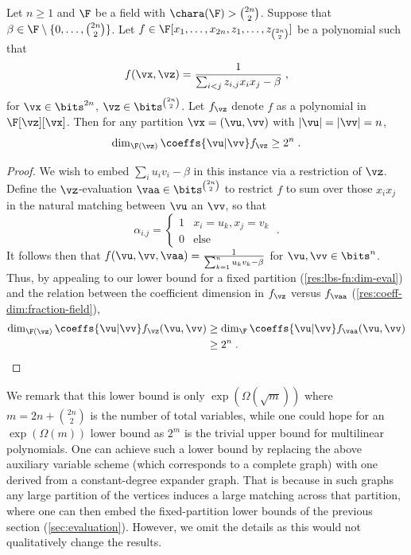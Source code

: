 \documentclass{toc}
\begin{document}
\begin{proposition}\label{res:lbs-fn:any-order:coeff-dim}
        Let $n\ge 1$ and $\F$ be a field with $\chara(\F)>\binom{2n}{2}$.  Suppose that $\beta\in\F\setminus\{0,\ldots,\binom{2n}{2}\}$.  Let $f\in\F[x_1,\ldots,x_{2n},z_1,\ldots,z_{\binom{2n}{2}}]$ be a polynomial such that
        \[
                f(\vx,\vz)=\frac{1}{\sum_{i<j} z_{i,j}x_ix_j-\beta}
                \;,
        \]
        for $\vx\in\bits^{2n}$, $\vz\in\bits^{\binom{2n}{2}}$. Let $f_\vz$ denote $f$ as a polynomial in $\F[\vz][\vx]$.  Then for any partition $\vx=(\vu,\vv)$ with $|\vu|=|\vv|=n$,
        \[
                \dim_{\F(\vz)}\coeffs{\vu|\vv} f_\vz \ge 2^n
                \;.
        \]
\end{proposition}
\begin{proof}
        We wish to embed $\sum_i u_iv_i-\beta$ in this instance via a restriction of $\vz$. Define the $\vz$-evaluation $\vaa\in\bits^{\binom{2n}{2}}$ to restrict $f$ to sum over those $x_ix_j$ in the natural matching between $\vu$ an $\vv$, so that
        \[
                \alpha_{i.j}
                =\begin{cases}
                        1       &       x_i=u_k, x_j=v_k\\
                        0       &       \text{else}
                \end{cases}
                \;.
        \]
        It follows then that $f(\vu,\vv,\vaa)=\frac{1}{\sum_{k=1}^n u_kv_k-\beta}$ for $\vu,\vv\in\bits^{n}$. Thus, by appealing to our lower bound for a fixed partition (\autoref{res:lbs-fn:dim-eval}) and the relation between the coefficient dimension in $f_\vz$ versus $f_\vaa$ (\autoref{res:coeff-dim:fraction-field}),
        \begin{align*}
                \dim_{\F(\vz)}\coeffs{\vu|\vv} f_\vz(\vu,\vv)
                &\ge \dim_\F \coeffs{\vu|\vv}f_\vaa(\vu,\vv)\\
                &\ge 2^n
                \;.
                \qedhere
        \end{align*}
\end{proof}

We remark that this lower bound is only $\exp(\Omega(\sqrt{m}))$ where $m=2n+\binom{2n}{2}$ is the number of total variables, while one could hope for an $\exp(\Omega(m))$ lower bound as $2^m$ is the trivial upper bound for multilinear polynomials.  One can achieve such a lower bound by replacing the above auxiliary variable scheme (which corresponds to a complete graph) with one derived from a constant-degree expander graph. That is because in such graphs any large partition of the vertices induces a large matching across that partition, where one can then embed the fixed-partition lower bounds of the previous section (\autoref{sec:evaluation}).  However, we omit the details as this would not qualitatively change the results.
%
\end{document}
